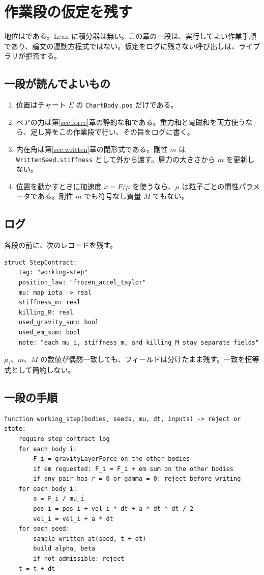 \section{作業段の仮定を残す}
\label{sec:contract}

地位は\dstopen{}である。Lean に積分器は無い。この章の一段は、実行してよい作業手順であり、論文の運動方程式ではない。仮定をログに残さない呼び出しは、ライブラリが拒否する。

\subsection{一段が読んでよいもの}

\begin{enumerate}
\item 位置はチャート \(E\) の \texttt{ChartBody.pos} だけである。
\item ペアの力は第\ref{sec:force}章の静的な和である。重力和と電磁和を両方使うなら、足し算をこの作業段で行い、その旨をログに書く。
\item 内在角は第\ref{sec:written}章の閉形式である。剛性 \(m\) は \texttt{WrittenSeed.stiffness} として外から渡す。層力の大きさから \(m\) を更新しない。
\item 位置を動かすときに加速度 \(\ddot x=F/\mu\) を使うなら、\(\mu\) は粒子ごとの慣性パラメータである。剛性 \(m\) でも符号なし質量 \(M\) でもない。
\end{enumerate}

\subsection{ログ}

各段の前に、次のレコードを残す。

\begin{verbatim}
struct StepContract:
    tag: "working-step"
    position_law: "frozen_accel_taylor"
    mu: map iota -> real
    stiffness_m: real
    killing_M: real
    used_gravity_sum: bool
    used_em_sum: bool
    note: "each mu_i, stiffness_m, and killing_M stay separate fields"
\end{verbatim}

\(\mu_i\)、\(m\)、\(M\) の数値が偶然一致しても、フィールドは分けたまま残す。一致を恒等式として簡約しない。

\subsection{一段の手順}

\begin{verbatim}
function working_step(bodies, seeds, mu, dt, inputs) -> reject or state:
    require step contract log
    for each body i:
        F_i = gravityLayerForce on the other bodies
        if em requested: F_i = F_i + em sum on the other bodies
        if any pair has r = 0 or gamma = 0: reject before writing
    for each body i:
        a = F_i / mu_i
        pos_i = pos_i + vel_i * dt + a * dt * dt / 2
        vel_i = vel_i + a * dt
    for each seed:
        sample written_at(seed, t + dt)
        build alpha, beta
        if not admissible: reject
    t = t + dt
\end{verbatim}

